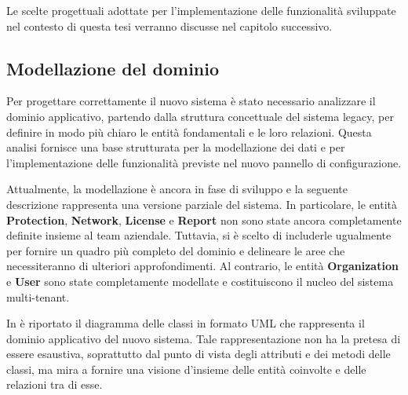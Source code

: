 Le scelte progettuali adottate per l'implementazione delle funzionalità sviluppate nel contesto di questa tesi verranno discusse nel capitolo successivo.

\subsection{Modellazione del dominio}\label{sec:domain-analysis}
Per progettare correttamente il nuovo sistema è stato necessario analizzare il dominio applicativo, partendo dalla struttura concettuale del sistema legacy, per definire in modo più chiaro le entità fondamentali e le loro relazioni. Questa analisi fornisce una base strutturata per la modellazione dei dati e per l'implementazione delle funzionalità previste nel nuovo pannello di configurazione.

Attualmente, la modellazione è ancora in fase di sviluppo e la seguente descrizione rappresenta una versione parziale del sistema. In particolare, le entità \textbf{Protection}, \textbf{Network}, \textbf{License} e \textbf{Report} non sono state ancora completamente definite insieme al team aziendale. Tuttavia, si è scelto di includerle ugualmente per fornire un quadro più completo del dominio e delineare le aree che necessiteranno di ulteriori approfondimenti.
%
Al contrario, le entità \textbf{Organization} e \textbf{User} sono state completamente modellate e costituiscono il nucleo del sistema multi-tenant.

In  è riportato il diagramma delle classi in formato UML che rappresenta il dominio applicativo del nuovo sistema. Tale rappresentazione non ha la pretesa di essere esaustiva, soprattutto dal punto di vista degli attributi e dei metodi delle classi, ma mira a fornire una visione d'insieme delle entità coinvolte e delle relazioni tra di esse.

